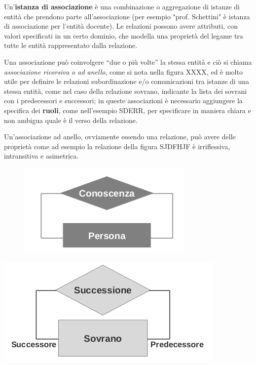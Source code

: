 \documentclass[a4paper,12pt, oneside]{book}
\begin{document}
Un'\textbf{istanza di associazione} è una combinazione o aggregazione di istanze di entità che prendono
parte all'associazione (per esempio "prof. Schettini" è istanza di associazione per l'entità docente).\newline
Le relazioni possono avere attributi, con valori specificati in un certo dominio, che  modella una proprietà del legame
tra tutte le entità rappresentato dalla relazione.

Una associazione può coinvolgere “due o più volte” la stessa entità e ciò si chiama \emph{associazione ricorsiva o ad anello},
come si nota nella figura XXXX, ed è molto utile per definire le relazioni subordinazione e/o comunicazioni tra istanze
di una stessa entità, come nel caso della relazione sovrano, indicante la lista dei sovrani con i predecessori e successori;
in queste associazioni è necessario aggiungere la specifica dei \textbf{ruoli}, come nell'esempio SDERR, per specificare
in maniera chiara e non ambigua quale è il verso della relazione.

Un'associazione ad anello, ovviamente essendo una relazione, può avere delle proprietà come ad esempio la relazione della figura
SJDFHJF è irriflessiva, intransitiva e asimetrica.

\begin{figure}
	\centering
	\includegraphics[scale=2.5]{img/bas7.png}
\end{figure}

\begin{center}
	\includegraphics[scale=2.5]{img/bas8.png}
\end{center}
\end{document}
